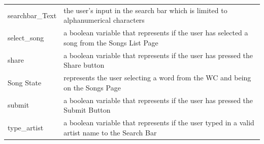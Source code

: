 \documentclass[]{article}
\begin{document}
\begin{longtable}[c]{@{}ll@{}}
\\\addlinespace
\begin{minipage}[t]{0.47\columnwidth}\raggedright
searchbar\_Text
\end{minipage} & \begin{minipage}[t]{0.47\columnwidth}\raggedright
the user's input in the search bar which is limited to alphanumerical characters
\end{minipage}
\\\addlinespace
\begin{minipage}[t]{0.47\columnwidth}\raggedright
select\_song
\end{minipage} & \begin{minipage}[t]{0.47\columnwidth}\raggedright
a boolean variable that represents if the user has selected a song from the Songs List Page
\end{minipage}
\\\addlinespace
\begin{minipage}[t]{0.47\columnwidth}\raggedright
share
\end{minipage} & \begin{minipage}[t]{0.47\columnwidth}\raggedright
a boolean variable that represents if the user has pressed the Share button
\end{minipage}
\\\addlinespace
\begin{minipage}[t]{0.47\columnwidth}\raggedright
Song State
\end{minipage} & \begin{minipage}[t]{0.47\columnwidth}\raggedright
represents the user selecting a word from the WC and being on the Songs Page
\end{minipage}
\\\addlinespace
\begin{minipage}[t]{0.47\columnwidth}\raggedright
submit
\end{minipage} & \begin{minipage}[t]{0.47\columnwidth}\raggedright
a boolean variable that represents if the user has pressed the Submit Button
\end{minipage}
\\\addlinespace
\begin{minipage}[t]{0.47\columnwidth}\raggedright
type\_artist
\end{minipage} & \begin{minipage}[t]{0.47\columnwidth}\raggedright
a boolean variable that represents if the user typed in a valid artist name to the Search Bar
\end{minipage}

\end{longtable}
\end{document}
